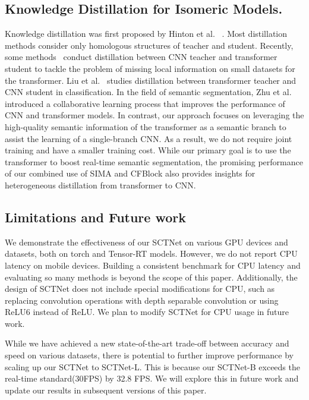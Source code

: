 \documentclass[letterpaper]{article} %
\begin{document}
\subsection{Knowledge Distillation for Isomeric Models.}
Knowledge distillation was first proposed by Hinton et al. ~\cite{hinton2015distilling}. Most distillation methods consider only homologous structures of teacher and student. Recently, some methods~\cite{touvron2021training,li2022locality} conduct distillation between CNN teacher and transformer student to tackle the problem of missing local information on small datasets for the transformer. Liu et al.~\cite{liu2022cross} studies distillation between transformer teacher and CNN student in classification. In the field of semantic segmentation, Zhu et al.~\cite{zhu2023good} introduced a collaborative learning process that improves the performance of CNN and transformer models. In contrast, our approach focuses on leveraging the high-quality semantic information of the transformer as a semantic branch to assist the learning of a single-branch CNN. As a result, we do not require joint training and have a smaller training cost. While our primary goal is to use the transformer to boost real-time semantic segmentation, the promising performance of our combined use of SIMA and CFBlock also provides insights for heterogeneous distillation from transformer to CNN.


\subsection{Limitations and Future work}
We demonstrate the effectiveness of our SCTNet on various GPU devices and datasets, both on torch and Tensor-RT models. However, we do not report CPU latency on mobile devices. Building a consistent benchmark for CPU latency and evaluating so many methods is beyond the scope of this paper. Additionally, the design of SCTNet does not include special modifications for CPU, such as replacing convolution operations with depth separable convolution or using ReLU6 instead of ReLU. We plan to modify SCTNet for CPU usage in future work.

While we have achieved a new state-of-the-art trade-off between accuracy and speed on various datasets, there is potential to further improve performance by scaling up our SCTNet to SCTNet-L. This is because our SCTNet-B exceeds the real-time standard(30FPS) by 32.8 FPS. We will explore this in future work and update our results in subsequent versions of this paper.
\end{document}
